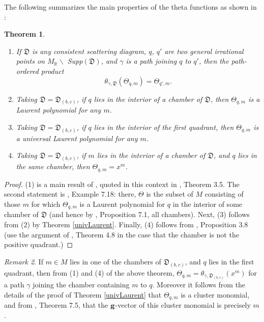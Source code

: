 \documentclass[11pt]{amsart}
\newcommand{\saySS}[1]{\say[SS]{#1}}
\newtheorem{theorem}{Theorem}[section]
\theoremstyle{remark}
\newtheorem{remark}[theorem]{Remark}
\numberwithin{equation}{section}
\newcommand{\RR}{\mathbb{R}}
\newcommand{\fD}{\mathfrak{D}}
\newcommand{\bfg}{{\bf g}}
\begin{document}
The following summarizes the main properties of the theta functions as shown in
\cite{GHKK}:
\begin{theorem} $ $
  \begin{enumerate}
    \item
      If $\fD$ is any consistent scattering diagram, $q$, $q'$ are two general
      irrational points on $M_{\RR} \smallsetminus$ Supp$(\fD)$, and $\gamma$ is a
      path joining $q$ to $q'$, then the path-ordered product 
      \saySS{Do you like this phrasing?}
      \[
        \theta_{\gamma, \fD }(\Theta_{q,m}) = \Theta_{q', m}. 
      \]
    
    \item 
      Taking $\fD=\fD_{(b,c)}$, if $q$ lies in the interior of a chamber of
      $\fD$, then $\Theta_{q,m}$ is a Laurent polynomial for any $m$.
    
    \item 
      Taking $\fD=\fD_{(b,c)}$, if $q$ lies in the interior of the first
      quadrant, then $\Theta_{q,m}$ is a universal Laurent polynomial for
      any $m$.

    \item 
      Taking $\fD=\fD_{(b,c)}$, if $m$ lies in the interior of a chamber of
      $\fD$, and $q$ lies in the same chamber, then $\Theta_{q,m}=x^{m}$.
   
  \end{enumerate}
\end{theorem}

\begin{proof}
  (1) is a main result of \cite{CPS}, quoted in this context in \cite{GHKK},
  Theorem 3.5.  The second statement is \cite{GHKK}, Example 7.18: there,
  $\Theta$ is the subset of $M$ consisting of those $m$ for which
  $\Theta_{q,m}$ is a Laurent polynomial for $q$ in the interior of 
  some chamber of $\fD$ (and hence by \cite{GHKK}, Proposition 7.1, all 
  chambers).
  Next, (3) follows from (2) by Theorem \ref{univLaurent}. 
  Finally, (4) follows from \cite{GHKK}, Proposition 3.8 (use the argument of
  \cite{GHKK}, Theorem 4.8 in the case that the chamber is not the positive
  quadrant.)
\end{proof}

\begin{remark} 
  \label{rk:theta functions g-vector}
  If $m\in M$ lies in one of the chambers of $\fD_{(b,c)}$, and $q$ lies in
  the first quadrant, then from (1) and (4) of the above theorem,
  $\Theta_{q,m}=\theta_{\gamma,\fD_{(b,c)}}(x^{m})$ for a path $\gamma$
  joining the chamber containing $m$ to $q$. Moreover it follows from the
  details of the proof of Theorem \ref{univLaurent} that $\Theta_{q,m}$ is
  a cluster monomial, and from \cite{GHKK}, Theorem 7.5, that the 
  $\bfg$-vector of this cluster monomial is precisely $m$. 
\end{remark}
\end{document}
